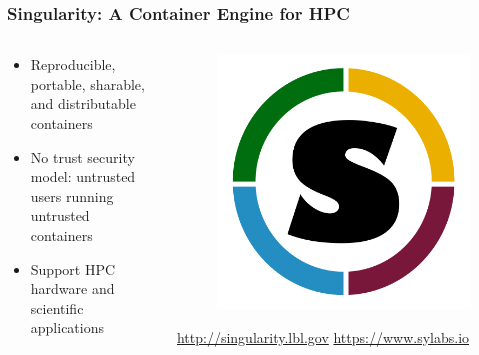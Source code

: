\documentclass{beamer}
\begin{document}
\begin{frame}
   \frametitle{Singularity: A Container Engine for HPC}
   \begin{columns}
      \begin{column}{0.6\textwidth}
         \begin{itemize}
            \setlength\itemsep{1.0em}
            \item Reproducible, portable, sharable, and distributable 
               containers
            \item No trust security model: untrusted users running 
               untrusted containers
            \item Support HPC hardware and scientific applications
         \end{itemize}
      \end{column}
      \hfill
      \begin{column}{0.5\textwidth}
         \begin{figure}[htbp]
            \includegraphics[width=1.0\textwidth]{images/singularity-logo.png}
         \end{figure}
         \begin{center}\small
            \url{http://singularity.lbl.gov}
            \url{https://www.sylabs.io}
         \end{center}
      \end{column}
   \end{columns}
\end{frame}
\end{document}
